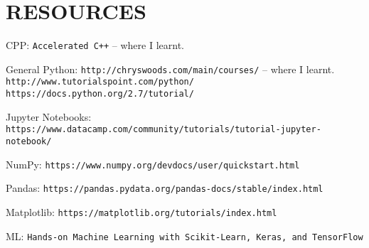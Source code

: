 \section{RESOURCES}

CPP:
\newline
\texttt{Accelerated C++} -- where I learnt.

General Python:
\newline
\texttt{http://chryswoods.com/main/courses/} -- where I learnt.
\newline
\texttt{http://www.tutorialspoint.com/python/}
\newline
\texttt{https://docs.python.org/2.7/tutorial/}

Jupyter Notebooks:
\newline
\texttt{https://www.datacamp.com/community/tutorials/tutorial-jupyter-notebook/}

NumPy:
\newline
\texttt{https://www.numpy.org/devdocs/user/quickstart.html}

Pandas:
\newline
\texttt{https://pandas.pydata.org/pandas-docs/stable/index.html}

Matplotlib:
\newline
\texttt{https://matplotlib.org/tutorials/index.html}

ML:
\newline
\texttt{Hands-on Machine Learning with Scikit-Learn, Keras, and TensorFlow}

